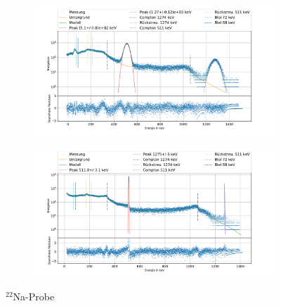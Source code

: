 \documentclass[
	a4paper,
	12pt,
	pagesize,
	ngerman
]{scrartcl}
\begin{document}
\begin{figure}[H]
		\centering
		\begin{subfigure}[c]{\textwidth}
			\centering
			\includegraphics[width= 1 \linewidth]{img/NaNa.pdf}
		\end{subfigure}
		\begin{subfigure}[c]{\textwidth}
			\centering
			\includegraphics[width= 1 \linewidth]{img/NaGe.pdf}
		\end{subfigure}
		\caption{$^{22}$Na-Probe}
		\label{fg_Na}
	\end{figure}
\end{document}
